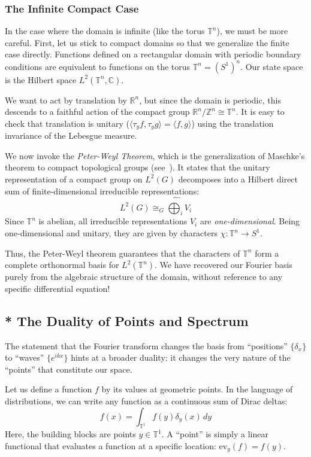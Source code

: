 \documentclass{article}
\newcommand{\C}{{\mathbb{C}}}
\newcommand{\R}{{\mathbb{R}}}
\newcommand{\T}{{\mathbb{T}}}
\newcommand{\Z}{{\mathbb{Z}}}
\begin{document}
\subsubsection*{The Infinite Compact Case}

In the case where the domain is infinite (like the torus $\T^n$), we must be more careful. First, let us
stick to compact domains so that we generalize the finite case directly. Functions defined on a rectangular
domain with periodic boundary conditions are equivalent to functions on the torus $\T^n = (S^1)^n$.
Our state space is the Hilbert space $L^2(\T^n, \C)$.

We want to act by translation by $\R^n$, but since the domain is periodic, this descends to a faithful action
of the compact group $\R^n/\Z^n \cong \T^n$. It is easy to check that translation is unitary ($\langle
\tau_y f, \tau_y g \rangle = \langle f,g \rangle$) using the translation invariance of the Lebesgue measure.

We now invoke the \emph{Peter-Weyl Theorem}, which is the generalization of Maschke's theorem to compact
topological groups (see~\cite{NateGeoRepTheory}). It states that the unitary representation of a compact
group on $L^2(G)$ decomposes into a Hilbert direct sum of finite-dimensional irreducible representations:
\[
	L^2(G) \cong_{G} \widehat{\bigoplus_i} V_i
\]
Since $\T^n$ is abelian, all irreducible representations $V_i$ are \emph{one-dimensional}. Being one-dimensional
and unitary, they are given by characters $\chi: \T^n \to S^1$.

Thus, the Peter-Weyl theorem guarantees that the characters of $\T^n$ form a complete orthonormal basis for
$L^2(\T^n)$. We have recovered our Fourier basis purely from the algebraic structure of the domain, without
reference to any specific differential equation!

\subsection*{* The Duality of Points and Spectrum}


The statement that the Fourier transform changes the basis from ``positions'' $\{\delta_x\}$ to ``waves''
$\{e^{ikx}\}$ hints at a broader duality: it changes the very nature of the ``points'' that constitute our
space.

Let us define a function $f$ by its values at geometric points. In the language of distributions, we can write
any function as a continuous sum of Dirac deltas:
\[
    f(x) = \int_{\T^1} f(y) \delta_y(x) \, dy
\]
Here, the building blocks are points $y \in \T^1$. A ``point'' is simply a linear functional that evaluates a
function at a specific location: $\text{ev}_y(f) = f(y)$.
\end{document}
